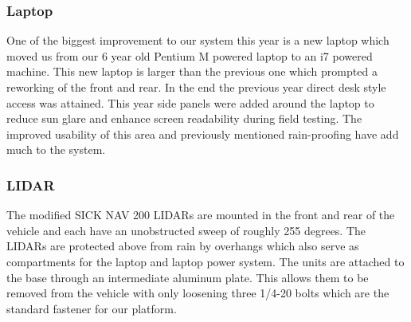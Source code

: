 \subsubsection{Laptop}
One of the biggest improvement to our system this year is a new laptop which moved us from our 6 year old Pentium M powered laptop to an i7 powered machine. This new laptop is larger than the previous one which prompted a reworking of the front and rear. In the end the previous year direct desk style access was attained. This year side panels were added around the laptop to reduce sun glare and enhance screen readability during field testing. The improved usability of this area and previously mentioned rain-proofing have add much to the system.

\subsubsection{LIDAR}
The modified SICK NAV 200 LIDARs are mounted in the front and rear of the vehicle and each have an unobstructed sweep of roughly 255 degrees. The LIDARs are protected above from rain by overhangs which also serve as compartments for the laptop and laptop power system. The units are attached to the base through an intermediate aluminum plate. This allows them to be removed from the vehicle with only loosening three 1/4-20 bolts which are the standard fastener for our platform.